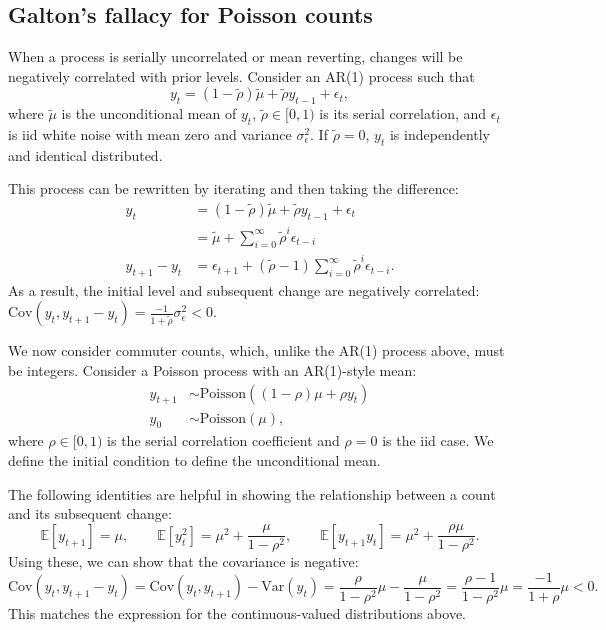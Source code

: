 \documentclass[11pt]{article}
\theoremstyle{definition}
\begin{document}
\subsection{Galton's fallacy for Poisson counts}\label{sec:appendix:theory:Galton}

When a process is serially uncorrelated or mean reverting,
changes will be negatively correlated with prior levels.
Consider an AR(1) process such that
\begin{equation*}
y_{t} = (1-\tilde{\rho}) \tilde{\mu} + \tilde{\rho} y_{t-1} + \epsilon_{t}
,\end{equation*}
where
$\tilde{\mu}$ is the unconditional mean of $y_t$,
$\tilde{\rho} \in [0,1)$ is its serial correlation,
and $\epsilon_{t}$ is iid white noise with mean zero and variance $\sigma^{2}_{\epsilon}$.
If $\tilde{\rho}=0$, $y_{t}$ is independently and identical distributed.

This process can be rewritten by iterating and then taking the difference:
\begin{align*}
y_{t}
&=
(1-\tilde{\rho}) \tilde{\mu} + \tilde{\rho} y_{t-1} + \epsilon_{t}
\\
&=
\tilde{\mu} + \sum^{\infty}_{i=0}\tilde{\rho}^{i}\epsilon_{t-i}
\\
y_{t+1} - y_{t}
&= \epsilon_{t+1} + (\tilde{\rho}-1)\sum^{\infty}_{i=0}\tilde{\rho}^{i} \epsilon_{t-i}
.\end{align*}
As a result, the initial level and subsequent change are negatively correlated:
$
\text{Cov}\left(y_{t}, y_{t+1} - y_{t}\right) 
=
\frac{-1}{1+\tilde{\rho}}\sigma^{2}_{\epsilon} < 0
$.

We now consider commuter counts, which, unlike the AR(1) process above, must be integers.
Consider a Poisson process with an AR(1)-style mean:
\begin{align*}
y_{t+1}
&\sim
\text{Poisson}\left((1-\rho)\mu + \rho y_{t}\right) \\
y_{0}
&\sim
\text{Poisson}\left(\mu\right),
\end{align*}
where $\rho \in [0,1)$ is the serial correlation coefficient and $\rho = 0$ is the iid case.
We define the initial condition to define the unconditional mean.

The following identities are helpful in showing the relationship between a count and its subsequent change:
\begin{equation*}
\mathbb{E}[y_{t+1}] 
=
\mu
,\qquad
\mathbb{E}\left[y^{2}_{t}\right] 
=
\mu^{2} + \frac{\mu}{1-\rho^{2}}
,\qquad
\mathbb{E}[y_{t+1}y_{t}]
=
\mu^{2} + \frac{\rho\mu}{1-\rho^{2}}
.\end{equation*}
Using these, we can show that the covariance is negative:
\begin{equation*}
\text{Cov}\left(y_{t}, y_{t+1}-y_{t}\right)
= 
\text{Cov}\left(y_{t}, y_{t+1}\right) - \text{Var}\left(y_{t}\right)
=
\frac{\rho}{1-\rho^{2}}\mu - \frac{\mu}{1-\rho^{2}}
=
\frac{\rho-1}{1-\rho^{2}}\mu
=
\frac{-1}{1+\rho}\mu
<
0
.\end{equation*}
This matches the expression for the continuous-valued distributions above.
\clearpage
\end{document}
